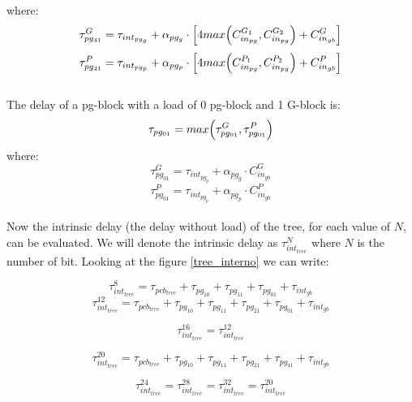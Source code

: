  where:
\begin{equation}
\tau_{pg_{41}}^G = \tau_{int_{pg_g}} + \alpha_{pg_g} \cdot \Bigl[ 4max\Bigl( C_{in_{pg}}^{G_1}, C_{in_{pg}}^{G_2}  \Bigr) + C_{in_{gb}}^{G} \Bigr]
\end{equation}
\begin{equation}
\tau_{pg_{41}}^P = \tau_{int_{pg_p}} + \alpha_{pg_p} \cdot \Bigl[ 4max\Bigl( C_{in_{pg}}^{P_1}, C_{in_{pg}}^{P_2}  \Bigr) + C_{in_{gb}}^{P} \Bigr]
\end{equation}
\\
The delay of a pg-block with a load of 0 pg-block and 1 G-block is:
\begin{equation}
\tau_{pg_{01}} = max\Bigl( \tau_{pg_{01}}^G, \tau_{pg_{01}}^P \Bigr)
\end{equation}
 where:
\begin{equation}
\tau_{pg_{01}}^G = \tau_{int_{pg_g}} + \alpha_{pg_g} \cdot C_{in_{gb}}^{G}
\end{equation}
\begin{equation}
\tau_{pg_{01}}^P = \tau_{int_{pg_p}} + \alpha_{pg_p} \cdot C_{in_{gb}}^{P}
\end{equation}
\\
Now the intrinsic delay (the delay without load) of the tree, for each value of $N$, can be evaluated. We will denote the intrinsic delay as $\tau_{int_{tree}}^N$ where $N$ is the number of bit. Looking at the figure \ref{tree_interno} we can write:

\begin{equation}
\tau_{int_{tree}}^{8} = \tau_{pcb_{tree}} + \tau_{pg_{10}} + \tau_{pg_{11}} + \tau_{pg_{01}} + \tau_{int_{gb}}
\end{equation}
\begin{equation}
\tau_{int_{tree}}^{12} =  \tau_{pcb_{tree}} + \tau_{pg_{10}} + \tau_{pg_{11}} + \tau_{pg_{21}} + \tau_{pg_{01}} + \tau_{int_{gb}}
\end{equation}

\begin{equation}
\tau_{int_{tree}}^{16} = \tau_{int_{tree}}^{12}
\label{yeah1}
\end{equation}

\begin{equation}
\tau_{int_{tree}}^{20} = \tau_{pcb_{tree}} + \tau_{pg_{10}} + \tau_{pg_{11}} + \tau_{pg_{21}} + \tau_{pg_{41}} + \tau_{int_{gb}}
\end{equation}

\begin{equation}
\tau_{int_{tree}}^{24} = \tau_{int_{tree}}^{28} = \tau_{int_{tree}}^{32} = \tau_{int_{tree}}^{20}
\label{yeah2}
\end{equation}

